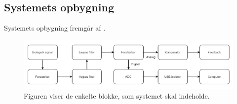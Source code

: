




\subsection{Systemets opbygning}
Systemets opbygning fremgår af .

\begin{figure}[H]
	\centering
	\includegraphics[scale=0.7]{figures/cProblemloesning/Systemopbygning.PNG}
	\caption{Figuren viser de enkelte blokke, som systemet skal indeholde.}
	\label{kravblok}
\end{figure}

